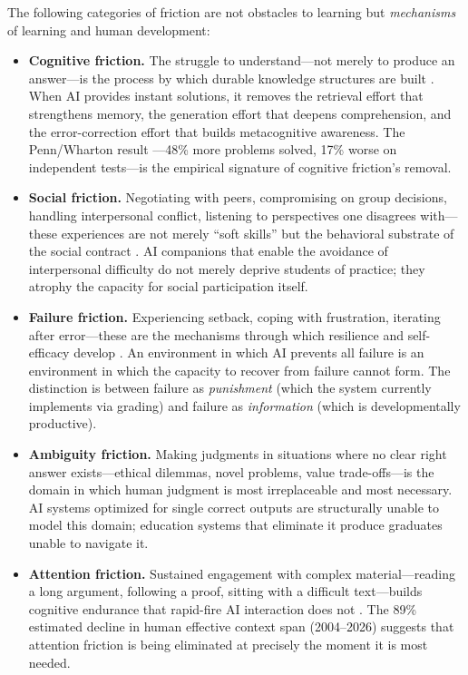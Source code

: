 \documentclass[12pt]{article}
\begin{document}
The following categories of friction are not obstacles to learning but \emph{mechanisms} of learning and human development:

\begin{itemize}[leftmargin=*]
    \item \textbf{Cognitive friction.} The struggle to understand---not merely to produce an answer---is the process by which durable knowledge structures are built \citep{Bjork1994desirable, Bjork2011desirable}. When AI provides instant solutions, it removes the retrieval effort that strengthens memory, the generation effort that deepens comprehension, and the error-correction effort that builds metacognitive awareness. The Penn/Wharton result \citep{Bastani2024chatgpt}---48\% more problems solved, 17\% worse on independent tests---is the empirical signature of cognitive friction's removal.
    \item \textbf{Social friction.} Negotiating with peers, compromising on group decisions, handling interpersonal conflict, listening to perspectives one disagrees with---these experiences are not merely ``soft skills'' but the behavioral substrate of the social contract \citep{Durkheim1956education, Fordham2023individualism}. AI companions that enable the avoidance of interpersonal difficulty do not merely deprive students of practice; they atrophy the capacity for social participation itself.
    \item \textbf{Failure friction.} Experiencing setback, coping with frustration, iterating after error---these are the mechanisms through which resilience and self-efficacy develop \citep{Bellwether2025struggle}. An environment in which AI prevents all failure is an environment in which the capacity to recover from failure cannot form. The distinction is between failure as \emph{punishment} (which the system currently implements via grading) and failure as \emph{information} (which is developmentally productive).
    \item \textbf{Ambiguity friction.} Making judgments in situations where no clear right answer exists---ethical dilemmas, novel problems, value trade-offs---is the domain in which human judgment is most irreplaceable and most necessary. AI systems optimized for single correct outputs are structurally unable to model this domain; education systems that eliminate it produce graduates unable to navigate it.
    \item \textbf{Attention friction.} Sustained engagement with complex material---reading a long argument, following a proof, sitting with a difficult text---builds cognitive endurance that rapid-fire AI interaction does not \citep{CognitiveDivergence2026}. The 89\% estimated decline in human effective context span (2004--2026) suggests that attention friction is being eliminated at precisely the moment it is most needed.
\end{itemize}
\end{document}
